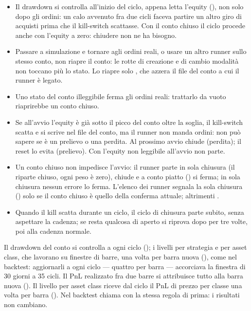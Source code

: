 \begin{itemize}
  \item Il drawdown si controlla all'inizio del ciclo, appena letta
        l'equity (), non solo dopo gli ordini: un
        calo avvenuto fra due cicli faceva partire un altro giro di acquisti
        prima che il kill-switch scattasse. Con il conto chiuso il ciclo
        procede anche con l'equity a zero: chiudere non ne ha bisogno.
  \item Passare a simulazione e tornare agli ordini reali, o usare un altro
        runner sullo stesso conto, non riapre il conto: le rotte di
        creazione e di cambio modalità non toccano più lo stato. Lo riapre
        solo , che azzera
        il file del conto a cui il runner è legato.
  \item Uno stato del conto illeggibile ferma gli ordini reali: trattarlo da
        vuoto riaprirebbe un conto chiuso.
  \item Se all'avvio l'equity è già sotto il picco del conto oltre la
        soglia, il kill-switch scatta e si scrive nel file del conto, ma il
        runner non manda ordini: non può sapere se è un prelievo o una
        perdita. Al prossimo avvio chiude (perdita); il reset lo evita
        (prelievo). Con l'equity non leggibile all'avvio non parte.
  \item Un conto chiuso non impedisce l'avvio: il runner parte in sola
        chiusura (il  riparte chiuso, ogni peso è
        zero), chiude e a conto piatto () si
        ferma; in sola chiusura nessun errore lo ferma. L'elenco dei runner
        segnala la sola chiusura () solo se il conto chiuso
        è quello della conferma attuale; altrimenti .
  \item Quando il kill scatta durante un ciclo, il ciclo di chiusura parte
        subito, senza aspettare la cadenza; se resta qualcosa di aperto si
        riprova dopo  per tre volte, poi alla
        cadenza normale.
\end{itemize}

\noindent
Il drawdown del conto si controlla a ogni ciclo
(); i livelli per strategia e per asset class, che
lavorano su finestre di barre, una volta per barra nuova
(), come nel backtest: aggiornarli a ogni
ciclo --- quattro per barra --- accorciava la finestra di \num{30} giorni a
\num{35} cicli. Il PnL realizzato fra due barre si attribuisce tutto alla
barra nuova (). Il
livello per asset class riceve dal ciclo il PnL di prezzo per classe una
volta per barra (). Nel backtest
 chiama  con la stessa regola di
prima: i risultati non cambiano.

